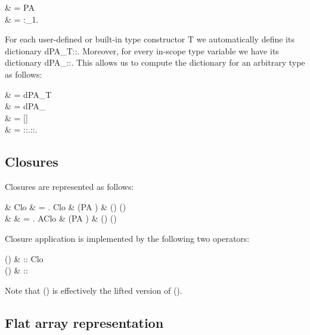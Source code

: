 \documentclass{article}
\begin{document}
\begin{haskell}
\patype{\sigma:{*}} & = PA \sigma \\
 & =
\forall\alpha:\kappa_1.\to{}
\end{haskell}

For each user-defined or built-in type constructor \<T\> we
automatically define its dictionary \<dPA_T::\>. Moreover, for every
in-scope type variable \<\alpha\> we have its dictionary
\<dPA_\alpha::\patype{\alpha}\>. This allows us to compute the dictionary for
an arbitrary type as follows:

\begin{haskell}
           & = dPA_T \\
\pa{\alpha}      & = dPA_{\alpha} \\
\pa{\sigma \phi} & = \pa{\sigma}[\phi] \pa{\phi} \\
 & =
\Lambda\alpha::\kappa.::\patype{\alpha::\kappa}.\pa{\sigma}
\end{haskell}

\subsection*{Closures}

Closures are represented as follows:

\begin{haskell}
\Data & Clo \alpha \beta & = \exists\gamma. Clo & (PA \gamma) \gamma
 & (\gamma\to\alpha\to\beta) (\parr{\gamma}\to\parr{\alpha}\to\parr{\beta}) \\
\DataI &  & = \exists\gamma. AClo & (PA \gamma)
  \parr{\gamma}
  & (\gamma\to\alpha\to\beta) (\parr{\gamma}\to\parr{\alpha}\to\parr{\beta}) 
\end{haskell}

Closure application is implemented by the following two operators:

\begin{haskell}
({\capp}) & :: Clo \alpha \beta \to \alpha \to \beta \\
({\cappP}) & ::  \to \parr{\alpha} \to \parr{\beta}
\end{haskell}

Note that \<({\cappP})\> is effectively the lifted version of \<({\capp})\>.

\subsection*{Flat array representation}
\end{document}

